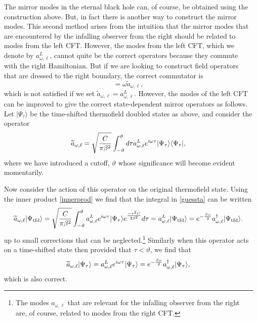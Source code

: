 \documentclass[12pt]{article}
\newcommand{\tfd}{\Psi_{\text{tfd}}} %
\newcommand{\tfdtau}{\Psi_{\tau}} %
\newcommand{\cop}[1]{#1}
\def\ta{\widetilde{\cop{a}}}
\def\cutoffT{\vartheta}
\newcommand{\be}{\begin{equation}}
\newcommand{\ee}{\end{equation}}
\begin{document}
The mirror modes in the eternal black hole can, of course, be obtained using the construction above. But, in fact there is another way to construct the mirror modes. This second method arises from
the intuition that the mirror modes that are encountered by the infalling observer from the right should be related to modes from the left CFT. However, the modes from the left CFT, which we denote by $a^{L}_{\omega, \ell}$, cannot quite be the correct operators because they commute with the right Hamiltonian. But if we are looking to construct field operators that are dressed to the right boundary, the correct commutator is
\be
[H_R, \ta_{\omega, \ell}] = \omega \ta_{\omega, \ell},
\ee
which is not satisfied if we set $\ta_{\omega, \ell} = a^{L}_{\omega, \ell}$. However, the modes of the left CFT can be improved to give the correct state-dependent mirror operators as follows.
Let  $|\tfdtau \rangle$ be the time-shifted thermofield doubled states as above, and consider the operator
\be
\label{guessta}
\ta_{\omega, \ell} = {\sqrt{ C \over \pi \beta^2}} \int_{-\cutoffT}^{\cutoffT} d \tau  a^{L}_{\omega, \ell} e^{i \omega \tau} |\tfdtau \rangle \langle \tfdtau |,
\ee
where we have introduced a cutoff, $\cutoffT$ whose significance will become evident momentarily.

Now consider the action of this operator on the original thermofield state. Using the inner product \eqref{innerprod} we find that the integral in \eqref{guessta} can be written
\be
\label{actionontfd}
\ta_{\omega, \ell} |\tfd \rangle = {\sqrt{ C \over \pi \beta^2}} \int_{-\cutoffT}^{\cutoffT} a^L_{\omega, \ell} e^{i \omega \tau} | \tfdtau \rangle e^{-\tau^2 C \over 2 \beta^2} d \tau = a_{\omega, \ell}^L | \tfd \rangle = e^{-{\beta \omega \over 2}} a_{\omega, \ell}^{\dagger} | \tfd \rangle.
\ee
up to small corrections that can be neglected.\footnote{The modes $a_{\omega, \ell}$ that are relevant for the infalling observer from the right are, of course, related to modes from the right CFT.} Similarly when this operator acts on a time-shifted state then provided that $\tau < \cutoffT$, we find that
\be
\ta_{\omega, \ell} |\tfdtau \rangle = a^L_{\omega, \ell} e^{i \omega \tau} | \tfdtau \rangle =  e^{-{\beta \omega \over 2}} a_{\omega, \ell}^{\dagger} | \tfdtau \rangle,
\ee
which is also correct.
\end{document}
